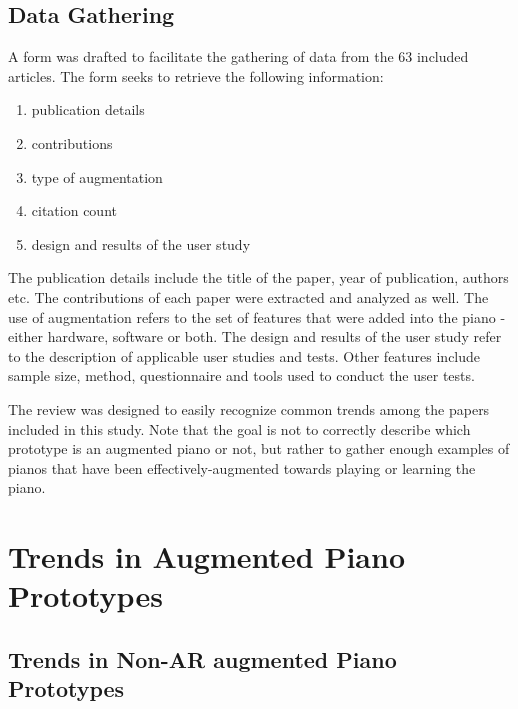 \documentclass[sigchi, review]{acmart}
\begin{document}
\subsection{Data Gathering}
\label{subsec: gathering}
A form was drafted to facilitate the gathering of data from the 63 included articles. The form seeks to retrieve the following information: 
\begin{enumerate}
    \item publication details
    \item contributions
    \item type of augmentation
    \item citation count
    \item design and results of the user study
\end{enumerate}
The publication details include the title of the paper, year of publication, authors etc. The contributions of each paper were extracted and analyzed as well. The use of augmentation refers to the set of features that were added into the piano - either hardware, software or both. The design and results of the user study refer to the description of applicable user studies and tests. Other features include sample size, method, questionnaire and tools used to conduct the user tests.

The review was designed to easily recognize common trends among the papers included in this study. Note that the goal is not to correctly describe which prototype is an augmented piano or not, but rather to gather enough examples of pianos that have been effectively-augmented towards playing or learning the piano.  

\section{Trends in Augmented Piano Prototypes}

\subsection{Trends in Non-AR augmented Piano Prototypes}
\end{document}
